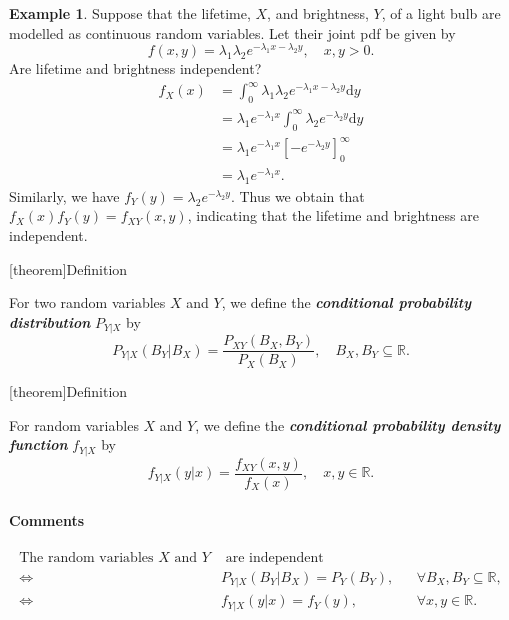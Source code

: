 \documentclass[12pt]{report}
\theoremstyle{definition}
\begin{document}
\newtheorem{independent example}[theorem]{Example}
\begin{independent example}
    Suppose that the lifetime, $X$, and brightness, $Y$, of a light bulb are
    modelled as continuous random variables. Let their joint pdf be given by
    \[
        f(x,y)=\lambda_1\lambda_2 e^{-\lambda_1 x-\lambda_2 y}, \quad
        x,y>0.
    \]
    Are lifetime and brightness independent?
    \begin{align*}
        f_X(x) & = \int_{0}^{\infty} \lambda_1\lambda_2 e^{-\lambda_1
        x-\lambda_2 y}\mathrm{d}y \\
               & = \lambda_1 e^{-\lambda_1 x}\int_{0}^{\infty}
               \lambda_2 e^{-\lambda_2 y}\mathrm{d}y \\
               & = \lambda_1 e^{-\lambda_1 x}\left[-e^{-\lambda_2
               y}\right]_0^\infty \\
               & = \lambda_1 e^{-\lambda_1 x}.
    \end{align*}
    Similarly, we have $f_Y(y)=\lambda_2 e^{-\lambda_2 y}$.
    Thus we obtain that $f_X(x)f_Y(y)=f_{XY}(x,y)$, indicating that the lifetime
    and brightness are independent.
\end{independent example}


[theorem]{Definition}
\begin{conditional probability distribution Y|X}
    For two random variables $X$ and $Y$, we define the
    \textbf{\emph{conditional probability distribution}} $P_{Y|X}$ by
    \[
        P_{Y|X}(B_Y|B_X)=\frac{P_{XY}(B_X,B_Y)}{P_X(B_X)},\quad
        B_X,B_Y\subseteq\mathbb{R}.
    \]
\end{conditional probability distribution Y|X}

[theorem]{Definition}
\begin{conditional pdf for continuous RV}
    For random variables $X$ and $Y$, we define the \textbf{\emph{conditional
    probability density function}} $f_{Y|X}$ by
    \[
        f_{Y|X}(y|x)=\frac{f_{XY}(x,y)}{f_X(x)},\quad
        x,y\in\mathbb{R}.
    \]
\end{conditional pdf for continuous RV}
\paragraph{Comments}
\begin{align*}
    \text{The random variables } X\text{ and }Y & \text{ are independent} && \\
    \iff & P_{Y|X}(B_Y|B_X)=P_Y(B_Y), && \forall B_X,B_Y\subseteq\mathbb{R}, \\
        \iff & f_{Y|X}(y|x)=f_Y(y), && \forall x,y\in\mathbb{R}.
\end{align*} 
\end{document}
